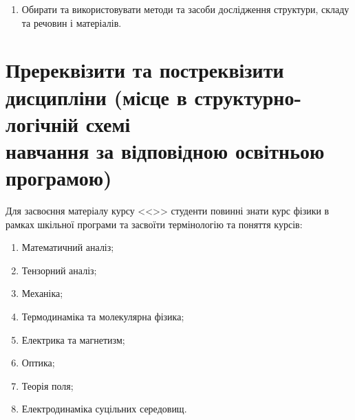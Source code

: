 \documentclass{Syllabus}
\begin{document}
\begin{enumerate}
	\item [ПРН 14:] Обирати та використовувати методи та засоби дослідження структури, складу та речовин і матеріалів.
\end{enumerate}


\section{Пререквізити та постреквізити дисципліни (місце в структурно-логічній схемі\\ навчання за відповідною освітньою програмою)}


Для засвоєння матеріалу курсу <<\discipline>> студенти повинні знати курс фізики в рамках шкільної програми та засвоїти термінологію та поняття курсів:
\begin{enumerate}
	\item Математичний аналіз;
	\item Тензорний аналіз;
	\item Механіка;
	\item Термодинаміка та молекулярна фізика;
	\item Електрика та магнетизм;
	\item Оптика;
	\item Теорія поля;
	\item Електродинаміка суцільних середовищ.
\end{enumerate}
\end{document}

